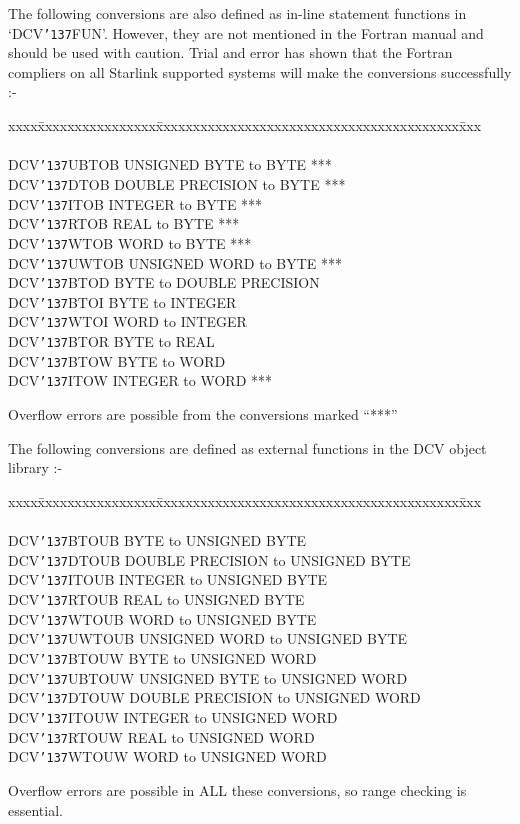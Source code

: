\documentclass[twoside,11pt]{article}
\renewcommand{\_}{{\tt\char'137}}     %
\begin{document}
\newpage

The following conversions are also defined as in-line statement functions in
`DCV\_FUN'. However, they are not mentioned in the Fortran manual and should be
used with caution. Trial and error has shown that the Fortran compliers on all
Starlink supported systems will make the conversions successfully :-

\begin{tabbing}
xxxx\=xxxxxxxxxxxxxxxx\=xxxxxxxxxxxxxxxxxxxxxxxxxxxxxxxxxxxxxxxxx\=xxx\kill
{}      \\
\\
\>DCV\_UBTOB \>UNSIGNED BYTE to BYTE          \>*** \\
\>DCV\_DTOB  \>DOUBLE PRECISION to BYTE       \>*** \\
\>DCV\_ITOB  \>INTEGER to BYTE                \>*** \\
\>DCV\_RTOB  \>REAL to BYTE                   \>*** \\
\>DCV\_WTOB  \>WORD to BYTE                   \>*** \\
\>DCV\_UWTOB \>UNSIGNED WORD to BYTE          \>*** \\
\>DCV\_BTOD  \>BYTE to DOUBLE PRECISION \\
\>DCV\_BTOI  \>BYTE to INTEGER \\
\>DCV\_WTOI  \>WORD to INTEGER \\
\>DCV\_BTOR  \>BYTE to REAL \\
\>DCV\_BTOW  \>BYTE to WORD \\
\>DCV\_ITOW  \>INTEGER to WORD                \>*** \\
\end{tabbing}
Overflow errors are possible from the conversions marked ``***''

The following conversions are defined as external
functions in the DCV object library :-
\begin{tabbing}
xxxx\=xxxxxxxxxxxxxxxx\=xxxxxxxxxxxxxxxxxxxxxxxxxxxxxxxxxxxxxxxxx\=xxx\kill
{}     \\
\\
\>DCV\_BTOUB  \>BYTE to UNSIGNED BYTE \\
\>DCV\_DTOUB  \>DOUBLE PRECISION to UNSIGNED BYTE \\
\>DCV\_ITOUB  \>INTEGER to UNSIGNED BYTE \\
\>DCV\_RTOUB  \>REAL to UNSIGNED BYTE \\
\>DCV\_WTOUB  \>WORD to UNSIGNED BYTE \\
\>DCV\_UWTOUB \>UNSIGNED WORD to UNSIGNED BYTE \\
\>DCV\_BTOUW  \>BYTE to UNSIGNED WORD \\
\>DCV\_UBTOUW \>UNSIGNED BYTE to UNSIGNED WORD \\
\>DCV\_DTOUW  \>DOUBLE PRECISION to UNSIGNED WORD \\
\>DCV\_ITOUW  \>INTEGER to UNSIGNED WORD \\
\>DCV\_RTOUW  \>REAL to UNSIGNED WORD \\
\>DCV\_WTOUW  \>WORD to UNSIGNED WORD \\
\end{tabbing}
Overflow errors are possible in ALL these conversions, so range checking is
essential.
\end{document}
